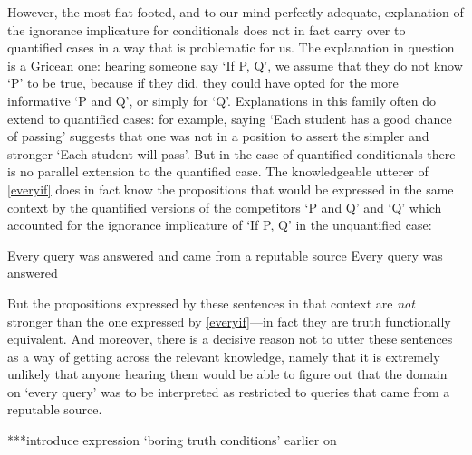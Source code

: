 \documentclass[If.tex]{subfiles}
\begin{document}
However, the most flat-footed, and to our mind perfectly adequate, explanation of the ignorance implicature for conditionals does not in fact carry over to quantified cases in a way that is problematic for us.  The explanation in question is a Gricean one: hearing someone say ‘If P, Q’, we assume that they do not know ‘P’ to be true, because if they did, they could have opted for the more informative ‘P and Q’, or simply for ‘Q’.  Explanations in this family often do extend to quantified cases: for example, saying ‘Each student has a good chance of passing’ suggests that one was not in a position to assert the simpler and stronger ‘Each student will pass’.  But in the case of quantified conditionals there is no parallel extension to the quantified case.  The knowledgeable utterer of \ref{everyif} does in fact know the propositions that would be expressed in the same context by the quantified versions of the competitors ‘P and Q’ and ‘Q’ which accounted for the ignorance implicature of ‘If P, Q’ in the unquantified case:
\begin{prop}
	\nitem
	Every query was answered and came from a reputable source
	\nitem
	Every query was answered
\end{prop}
But the propositions expressed by these sentences in that context are \emph{not} stronger than the one expressed by \ref{everyif}---in fact they are truth functionally equivalent.  And moreover, there is a decisive reason not to utter these sentences as a way of getting across the relevant knowledge, namely that it is extremely unlikely that anyone hearing them would be able to figure out that the domain on ‘every query’ was to be interpreted as restricted to queries that came from a reputable source.  

***introduce expression ‘boring truth conditions’ earlier on
\end{document}
